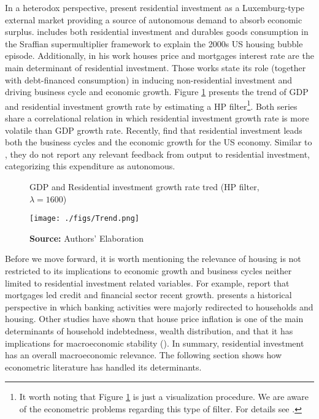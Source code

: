 \documentclass[12pt, a4paper]{article}
\begin{document}
In a heterodox perspective, \textcites{fiebiger_semi-autonomous_2018}{fiebiger_trend_2017} present residential investment as a Luxemburg-type external market providing a source of autonomous demand to absorb economic surplus.
\textcite{teixeira_crescimento_2015} includes both residential investment  and durables goods consumption in the Sraffian supermultiplier framework to explain the 2000s US housing bubble episode.
Additionally, in his work houses price and mortgages interest rate are the main determinant of residential investment.
Those works state its role (together with debt-financed consumption) in inducing non-residential investment and driving business cycle and economic growth.
Figure \ref{fig:trend} presents the trend of GDP and residential investment growth rate by estimating a HP filter\footnote{It worth noting that Figure \ref{fig:trend} is just a visualization procedure. We are aware of the econometric problems regarding this type of filter. For details see \textcite{NBER_HP}.}.
Both series share a correlational relation in which residential investment growth rate is more volatile than GDP growth rate.
Recently, \textcite{perez_Montiel_2021} find that residential investment leads both the business cycles and the economic growth for the US economy.
Similar to \textcite{girardi_long-run_2016}, they do not report any relevant feedback from output to residential investment, categorizing this expenditure as autonomous.

\begin{figure}[H]
	\centering
	\caption{GDP and Residential investment growth rate tred (HP filter, $\lambda = 1600$)}
	\label{fig:trend}
	\texttt{[image: ./figs/Trend.png]}
	\caption*{\textbf{Source:} Authors' Elaboration}
\end{figure}


Before we move forward, it is worth mentioning the relevance of housing is not restricted to its implications to economic growth and business cycles neither limited to residential investment related variables.
For example, \textcite{jorda_great_2016} report that mortgages led credit and financial sector recent growth.
\textcite{kohl_more_2018} presents a historical perspective in which banking activities were majorly redirected to households and housing.
Other studies have shown that house price inflation is one of the main determinants of household indebtedness, wealth distribution, and that it has implications for macroeconomic stability (\cites{stockhammer_debt-driven_2016}{johnston_global_2017}{mian_household_2017}{fuller_housing_2020}).
In summary, residential investment has an overall macroeconomic relevance.
The following section shows how econometric literature has handled its determinants.
\end{document}
